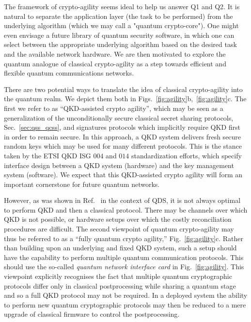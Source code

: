 The framework of crypto-agility seems ideal to help us answer Q1 and Q2. It is natural to separate the application layer (the task to be performed) from the underlying algorithm (which we may call a "quantum crypto-core"). One might even envisage a future library of quantum security software, in which one can select between the appropriate underlying algorithm based on the desired task and the available network hardware. We are then motivated to explore the quantum analogue of classical crypto-agility as a step towards efficient and flexible quantum communications networks.



There are two potential ways to translate the idea of classical crypto-agility into the quantum realm. We depict them both in Figs.~\ref{fig:agility}b,~\ref{fig:agility}c. The first we refer to as ``QKD-assisted crypto agility'', which may be seen as a generalization of the unconditionally secure classical secret sharing protocols, Sec.~\ref{sec:qss_qcss}, and signatures protocols \cite{Wallden2015, Amiri2016a} which implicitly require QKD first in order to remain secure. In this approach, a QKD system delivers fresh secure random keys which may be used for many different protocols. This is the stance taken by the ETSI QKD ISG $004$ \cite{ETSI004} and $014$ \cite{ETSI014} standardization efforts, which specify interface design between a QKD system (hardware) and the key management system (software). We expect that this QKD-assisted crypto agility will form an important cornerstone for future quantum networks. %

However, as was shown in Ref.~\cite{Amiri2016} in the context of QDS, it is not always optimal to perform QKD and then a classical protocol. There may be channels over which QKD is not possible, or hardware setups over which the costly reconciliation procedures are difficult. The second viewpoint of quantum crypto-agility may thus be referred to as a ``fully quantum crypto agility,'' Fig.~\ref{fig:agility}c. Rather than building upon an underlying and fixed QKD system, such a setup should have the capability to perform multiple quantum communication protocols. This should use the so-called \emph{quantum network interface card} in Fig.~\ref{fig:agility}. This viewpoint explicitly recognises the fact that multiple quantum cryptographic protocols differ only in classical postprocessing while sharing a quantum stage and so a full QKD protocol may not be required. %
In a deployed system the ability to perform new quantum cryptographic protocols may then be reduced to a mere upgrade of classical firmware to control the postprocessing.



